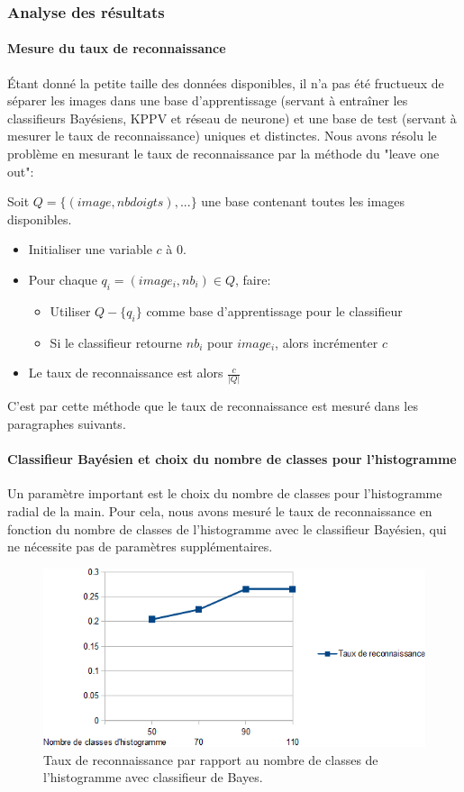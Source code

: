 \subsubsection{Analyse des résultats}
\paragraph{Mesure du taux de reconnaissance}
Étant donné la petite taille des données disponibles, il n'a pas été fructueux de séparer les images dans une base d'apprentissage (servant à entraîner les classifieurs Bayésiens, KPPV et réseau de neurone) et une base de test (servant à mesurer le taux de reconnaissance) uniques et distinctes. Nous avons résolu le problème en mesurant le taux de reconnaissance par la méthode du "leave one out":

Soit $Q = \{(image, nbdoigts), ...\}$ une base contenant toutes les images disponibles.
\begin{itemize}
\item Initialiser une variable $c$ à 0.
\item Pour chaque $q_i = (image_i, nb_i) \in Q$, faire:
\begin{itemize}
\item Utiliser $Q - \{q_i\}$ comme base d'apprentissage pour le classifieur
\item Si le classifieur retourne $nb_i$ pour $image_i$, alors incrémenter $c$
\end{itemize}
\item Le taux de reconnaissance est alors $\frac{c}{|Q|}$
\end{itemize}

C'est par cette méthode que le taux de reconnaissance est mesuré dans les paragraphes suivants.

\paragraph{Classifieur Bayésien et choix du nombre de classes pour l'histogramme}
Un paramètre important est le choix du nombre de classes pour l'histogramme radial de la main. Pour cela, nous avons mesuré le taux de reconnaissance en fonction du nombre de classes de l'histogramme avec le classifieur Bayésien, qui ne nécessite pas de paramètres supplémentaires.

\begin{figure}[htb!]
\centerline{\includegraphics[scale=0.8]{bayesRate.png}}
\caption{Taux de reconnaissance par rapport au nombre de classes de l'histogramme avec classifieur de Bayes.}
\label{fig:bayesRates}
\end{figure}

